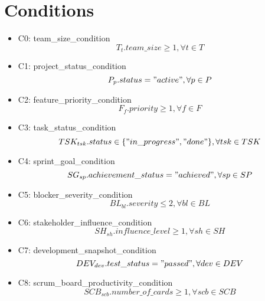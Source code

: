 \documentclass{article}
\begin{document}
\section{Conditions}
\begin{itemize}
    \item C0: team\_size\_condition
        \begin{equation*}
            T_{t}.team\_size \geq 1, \forall t \in T
        \end{equation*}
    \item C1: project\_status\_condition
        \begin{equation*}
            P_{p}.status = "active", \forall p \in P
        \end{equation*}
    \item C2: feature\_priority\_condition
        \begin{equation*}
            F_{f}.priority \geq 1, \forall f \in F
        \end{equation*}
    \item C3: task\_status\_condition
        \begin{equation*}
            TSK_{tsk}.status \in \{"in\_progress", "done"\}, \forall tsk \in TSK
        \end{equation*}
    \item C4: sprint\_goal\_condition
        \begin{equation*}
            SG_{sp}.achievement\_status = "achieved", \forall sp \in SP
        \end{equation*}
    \item C5: blocker\_severity\_condition
        \begin{equation*}
            BL_{bl}.severity \leq 2, \forall bl \in BL
        \end{equation*}
    \item C6: stakeholder\_influence\_condition
        \begin{equation*}
            SH_{sh}.influence\_level \geq 1, \forall sh \in SH
        \end{equation*}
    \item C7: development\_snapshot\_condition
        \begin{equation*}
            DEV_{dev}.test\_status = "passed", \forall dev \in DEV
        \end{equation*}
    \item C8: scrum\_board\_productivity\_condition
        \begin{equation*}
            SCB_{scb}.number\_of\_cards \geq 1, \forall scb \in SCB

\end{equation*}
\end{itemize}
\end{document}
